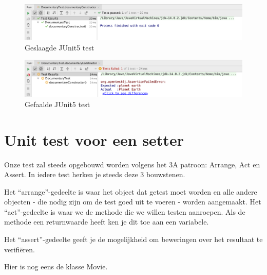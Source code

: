 \documentclass{tstextbook}
\begin{document}
\begin{figure}[H]
  \includegraphics[width=\linewidth]{images/h1/junit_test_passed.png}
  \caption{Geslaagde JUnit5 test}
  \label{fig:test_passed}
\end{figure}

\begin{figure}[H]
  \includegraphics[width=\linewidth]{images/h1/junit_test_failed.png}
  \caption{Gefaalde JUnit5 test}
  \label{fig:test_failed}
\end{figure}

\section{Unit test voor een setter}

Onze test zal steeds opgebouwd worden volgens het 3A patroon: Arrange, Act en Assert.
In iedere test herken je steeds deze 3 bouwstenen. 

Het ``arrange''-gedeelte is waar het object dat getest moet worden en alle andere objecten - die nodig zijn om de test goed uit te voeren - worden aangemaakt. 
Het ``act''-gedeelte is waar we de methode die we willen testen aanroepen. Als de methode een returnwaarde heeft ken je dit toe aan een variabele.

Het ``assert''-gedeelte geeft je de mogelijkheid om beweringen over het resultaat te verifi\"eren.

Hier is nog eens de klasse Movie.
\end{document}
